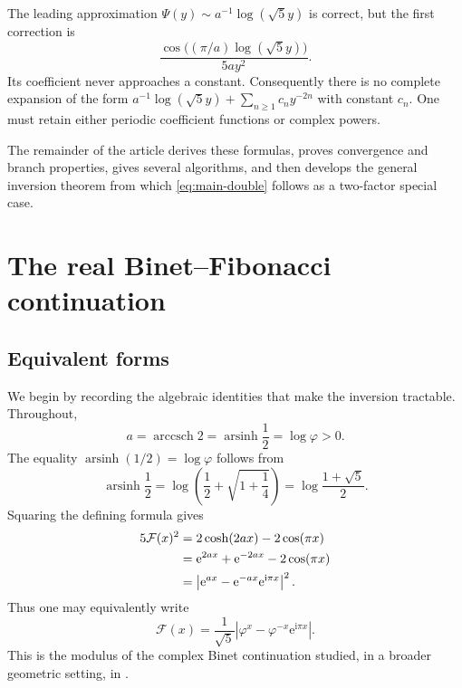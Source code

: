 \documentclass[11pt,oneside]{article}
\theoremstyle{plain}
\theoremstyle{definition}
\theoremstyle{remark}
\newcommand{\e}{\mathrm{e}}
\newcommand{\ii}{\mathrm{i}}
\newcommand{\Fcal}{\mathcal{F}}
\newcommand{\phig}{\varphi}
\newcommand{\abs}[1]{\left\lvert#1\right\rvert}
\newcommand{\arsinh}{\operatorname{arsinh}}
\newcommand{\arccsch}{\operatorname{arccsch}}
\begin{document}
\begin{warningbox}[title={Why a constant-coefficient inverse series cannot be complete}]
The leading approximation \(\Psi(y)\sim a^{-1}\log(\sqrt5y)\) is correct, but
the first correction is
\[
 \frac{\cos\!\bigl((\pi/a)\log(\sqrt5y)\bigr)}{5ay^2}.
\]
Its coefficient never approaches a constant.  Consequently there is no
complete expansion of the form
\(a^{-1}\log(\sqrt5y)+\sum_{n\ge1}c_ny^{-2n}\) with constant \(c_n\).
One must retain either periodic coefficient functions or complex powers.
\end{warningbox}

The remainder of the article derives these formulas, proves convergence and
branch properties, gives several algorithms, and then develops the general
inversion theorem from which \eqref{eq:main-double} follows as a two-factor
special case.

\section{The real Binet--Fibonacci continuation}
\label{sec:function}

\subsection{Equivalent forms}

We begin by recording the algebraic identities that make the inversion
tractable.  Throughout,
\begin{equation}
 a=\arccsch 2=\arsinh\frac12=\log\phig>0.
 \label{eq:a-identities}
\end{equation}
The equality \(\arsinh(1/2)=\log\phig\) follows from
\[
 \arsinh\frac12=\log\left(\frac12+\sqrt{1+\frac14}\right)
 =\log\frac{1+\sqrt5}{2}.
\]
Squaring the defining formula gives
\begin{align}
 5\Fcal(x)^2
 &=2\cosh(2ax)-2\cos(\pi x) \notag\\
 &=\e^{2ax}+\e^{-2ax}-2\cos(\pi x) \label{eq:F-square-exp}\\
 &=\abs{\e^{ax}-\e^{-ax}\e^{\ii\pi x}}^2. \label{eq:F-modulus}
\end{align}
Thus one may equivalently write
\begin{equation}
 \Fcal(x)=\frac1{\sqrt5}
 \abs{\phig^x-\phig^{-x}\e^{\ii\pi x}}.
 \label{eq:F-complex-Binet}
\end{equation}
This is the modulus of the complex Binet continuation studied, in a broader
geometric setting, in \cite{OzvatanPashaev2017}.
\end{document}
